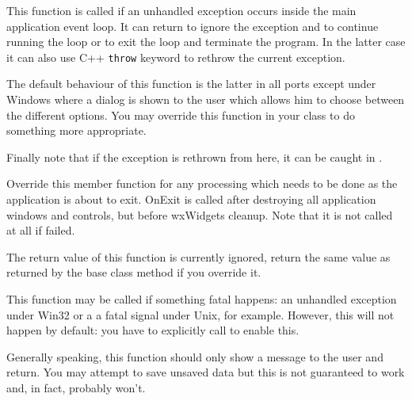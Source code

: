 

\label{wxapponexceptioninmainloop}


This function is called if an unhandled exception occurs inside the main
application event loop. It can return \true to ignore the exception and to
continue running the loop or \false to exit the loop and terminate the
program. In the latter case it can also use C++ \texttt{throw} keyword to
rethrow the current exception.

The default behaviour of this function is the latter in all ports except under
Windows where a dialog is shown to the user which allows him to choose between
the different options. You may override this function in your class to do
something more appropriate.

Finally note that if the exception is rethrown from here, it can be caught in 
.


\label{wxapponexit}


Override this member function for any processing which needs to be
done as the application is about to exit. OnExit is called after
destroying all application windows and controls, but before
wxWidgets cleanup. Note that it is not called at all if 
 failed.

The return value of this function is currently ignored, return the same value
as returned by the base class method if you override it.


\label{wxapponfatalexception}


This function may be called if something fatal happens: an unhandled
exception under Win32 or a a fatal signal under Unix, for example. However,
this will not happen by default: you have to explicitly call 
 to enable this.

Generally speaking, this function should only show a message to the user and
return. You may attempt to save unsaved data but this is not guaranteed to
work and, in fact, probably won't.


